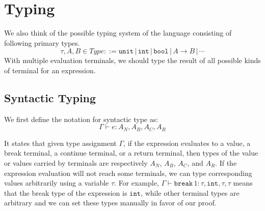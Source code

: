 \documentclass{article}
\numberwithin{algorithm}{section}
\newcommand{\cbreak}{\texttt{break}\,}
\newcommand{\tunit}{\texttt{unit}}
\newcommand{\tint}{\texttt{int}}
\newcommand{\tbool}{\texttt{bool}}
\newcommand{\sep}{\,|\,}
\begin{document}

\section{Typing}

We also think of the possible typing system of the language consisting of following primary types.
$$
\tau, A, B \in \textit{Type} ::= \tunit \sep \tint \sep \tbool \sep A \rightarrow B \sep \cdots
$$
With multiple evaluation terminals, we should type the result of all possible kinds of terminal for an expression.

\subsection{Syntactic Typing}

We first define the notation for syntactic type as:
$$
    \Gamma \vdash e: A_N, A_B, A_C, A_R
$$

It states that given type assignment $\Gamma$, if the expression evaluates to a value, a break terminal, a continue terminal, or a return terminal, then types of the value or values carried by terminals are respectively $A_N$, $A_B$, $A_C$, and $A_R$.
If the expression evaluation will not reach some terminals, we can type corresponding values arbitrarily using a variable $\tau$.
For example, $\Gamma \vdash \cbreak 1: \tau, \tint, \tau, \tau$ means that the break type of the expression is $\tint$, while other terminal types are arbitrary and we can set these types manually in favor of our proof.


\end{document}

